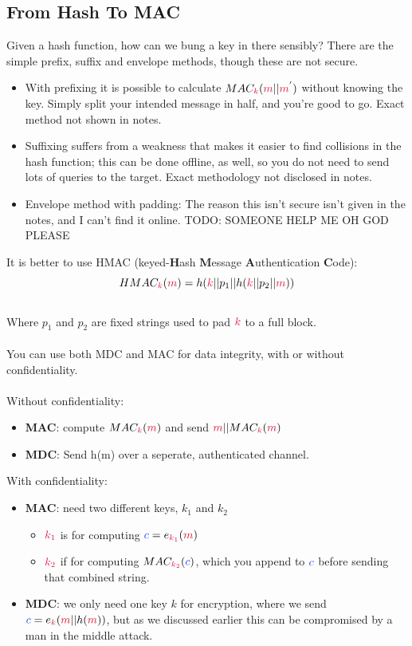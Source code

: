     \subsection{From Hash To MAC}

    Given a hash function, how can we bung a key in there sensibly? There are the simple prefix, suffix and envelope methods, though these are not secure.
    \begin{itemize}
        \item With prefixing it is possible to calculate $MAC_{\ck}(\cm||\cm^{'})$ without knowing the key. Simply split your intended message in half, and you're good to go. Exact method not shown in notes.
        \item Suffixing suffers from a weakness that makes it easier to find collisions in the hash function; this can be done offline, as well, so you do not need to send lots of queries to the target. Exact methodology not disclosed in notes.
        \item Envelope method with padding: The reason this isn't secure isn't given in the notes, and I can't find it online. TODO: SOMEONE HELP ME OH GOD PLEASE
    \end{itemize}

    It is better to use HMAC (keyed-\textbf{H}ash \textbf{M}essage \textbf{A}uthentication \textbf{C}ode):\\
    $$HMAC_{\ck}(\cm) = h(\ck||p_{1}||h(\ck||p_{2}||\cm))$$
    \\
    Where $p_{1}$ and $p_{2}$ are fixed strings used to pad $\ck$ to a full block.\\
    \\
    You can use both MDC and MAC for data integrity, with or without confidentiality.\\
    \\

    Without confidentiality:
    \begin{itemize}
        \item \textbf{MAC}: compute $MAC_{\ck}(\cm)$ and send $\cm||MAC_{\ck}(\cm)$
        \item \textbf{MDC}: Send h(m) over a seperate, authenticated channel.
    \end{itemize}

    With confidentiality:
    \begin{itemize}
        \item \textbf{MAC}: need two different keys, $k_{1}$ and $k_{2}$
        \begin{itemize}
            \item $\csubk{1}$ is for computing $\cc = e_{\csubk{1}}(\cm)$
            \item $\csubk{2}$ if for computing $MAC_{\csubk{2}}(\cc)$, which you append to $\cc$ before sending that combined string.
        \end{itemize}
        \item \textbf{MDC}: we only need one key $k$ for encryption, where we send $\cc = e_{\ck}(\cm||h(\cm))$, but as we discussed earlier this can be compromised by a man in the middle attack.
    \end{itemize}
